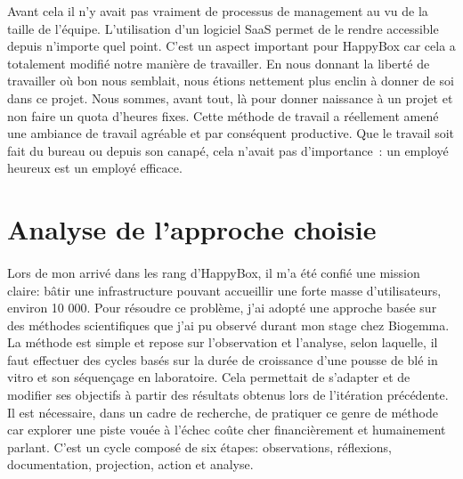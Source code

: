 \documentclass[11pt, a4paper ]{article}
\let\stdsection\section
\renewcommand\section{\newpage\stdsection}
\begin{document}
\begin{spacing}{1.5}
Avant cela il n'y avait pas vraiment de processus de management au vu de la taille de l'équipe. L'utilisation d'un logiciel SaaS permet de le rendre accessible depuis n'importe quel point. C'est un aspect important pour HappyBox car cela a totalement modifié notre manière de travailler.  En nous donnant la liberté de travailler où bon nous semblait, nous étions nettement plus enclin à donner de soi dans ce projet. Nous sommes, avant tout, là pour donner naissance à un projet et non faire un quota d'heures fixes. Cette méthode de travail a réellement amené une ambiance de travail agréable et par conséquent productive. Que le travail soit fait du bureau ou depuis son canapé, cela n'avait pas d'importance : un employé heureux est un employé efficace.


	\section{Analyse de l'approche choisie} %
\paragraph{}
Lors de mon arrivé dans les rang d'HappyBox, il m'a été confié une mission claire: bâtir une infrastructure pouvant accueillir une forte masse d'utilisateurs, environ 10 000. Pour résoudre ce problème, j'ai adopté une approche basée sur des méthodes scientifiques que j'ai pu observé durant mon stage chez Biogemma. La méthode est simple et repose sur l'observation et l'analyse, selon laquelle, il faut effectuer des cycles basés sur la durée de croissance d'une pousse de blé in vitro et son séquençage en laboratoire. Cela permettait de s'adapter et de modifier ses objectifs à partir des résultats obtenus lors de l'itération précédente.
Il est nécessaire, dans un cadre de recherche, de pratiquer ce genre de méthode car explorer une piste vouée à l’échec coûte cher financièrement et humainement parlant. C'est un cycle composé de six étapes: observations, réflexions, documentation, projection, action et analyse.


\end{spacing}
\end{document}

